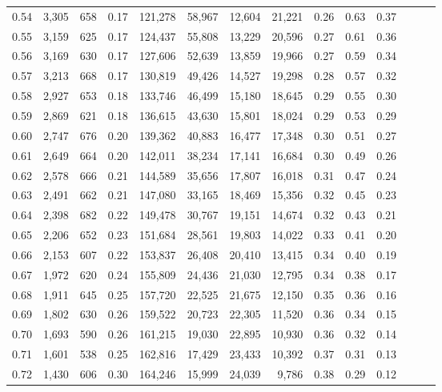 \begin{tabular}{rrrrrrrrrrrrrr}
0.54 &  3,305 &  658 &  0.17 &  121,278 &   58,967 &  12,604 &  21,221 &  0.26 &  0.63 &      0.37 \\
0.55 &  3,159 &  625 &  0.17 &  124,437 &   55,808 &  13,229 &  20,596 &  0.27 &  0.61 &      0.36 \\
0.56 &  3,169 &  630 &  0.17 &  127,606 &   52,639 &  13,859 &  19,966 &  0.27 &  0.59 &      0.34 \\
0.57 &  3,213 &  668 &  0.17 &  130,819 &   49,426 &  14,527 &  19,298 &  0.28 &  0.57 &      0.32 \\
0.58 &  2,927 &  653 &  0.18 &  133,746 &   46,499 &  15,180 &  18,645 &  0.29 &  0.55 &      0.30 \\
0.59 &  2,869 &  621 &  0.18 &  136,615 &   43,630 &  15,801 &  18,024 &  0.29 &  0.53 &      0.29 \\
0.60 &  2,747 &  676 &  0.20 &  139,362 &   40,883 &  16,477 &  17,348 &  0.30 &  0.51 &      0.27 \\
0.61 &  2,649 &  664 &  0.20 &  142,011 &   38,234 &  17,141 &  16,684 &  0.30 &  0.49 &      0.26 \\
0.62 &  2,578 &  666 &  0.21 &  144,589 &   35,656 &  17,807 &  16,018 &  0.31 &  0.47 &      0.24 \\
0.63 &  2,491 &  662 &  0.21 &  147,080 &   33,165 &  18,469 &  15,356 &  0.32 &  0.45 &      0.23 \\
0.64 &  2,398 &  682 &  0.22 &  149,478 &   30,767 &  19,151 &  14,674 &  0.32 &  0.43 &      0.21 \\
0.65 &  2,206 &  652 &  0.23 &  151,684 &   28,561 &  19,803 &  14,022 &  0.33 &  0.41 &      0.20 \\
0.66 &  2,153 &  607 &  0.22 &  153,837 &   26,408 &  20,410 &  13,415 &  0.34 &  0.40 &      0.19 \\
0.67 &  1,972 &  620 &  0.24 &  155,809 &   24,436 &  21,030 &  12,795 &  0.34 &  0.38 &      0.17 \\
0.68 &  1,911 &  645 &  0.25 &  157,720 &   22,525 &  21,675 &  12,150 &  0.35 &  0.36 &      0.16 \\
0.69 &  1,802 &  630 &  0.26 &  159,522 &   20,723 &  22,305 &  11,520 &  0.36 &  0.34 &      0.15 \\
0.70 &  1,693 &  590 &  0.26 &  161,215 &   19,030 &  22,895 &  10,930 &  0.36 &  0.32 &      0.14 \\
0.71 &  1,601 &  538 &  0.25 &  162,816 &   17,429 &  23,433 &  10,392 &  0.37 &  0.31 &      0.13 \\
0.72 &  1,430 &  606 &  0.30 &  164,246 &   15,999 &  24,039 &   9,786 &  0.38 &  0.29 &      0.12 \\

\end{tabular}
